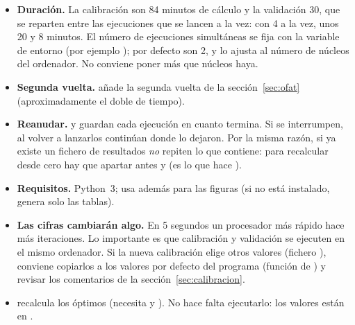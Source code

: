 \begin{itemize}
  \item \textbf{Duración.} La calibración son 84 minutos de cálculo y la validación 30, que se
        reparten entre las ejecuciones que se lancen a la vez: con 4 a la vez, unos 20 y 8
        minutos. El número de ejecuciones simultáneas se fija con la variable de entorno
         (por ejemplo ); por defecto son 2,
        y  lo ajusta al número de núcleos del ordenador. No conviene
        poner más que núcleos haya.
  \item \textbf{Segunda vuelta.}  añade la segunda vuelta de
        la sección~\ref{sec:ofat} (aproximadamente el doble de tiempo).
  \item \textbf{Reanudar.}  y  guardan cada ejecución en
        cuanto termina. Si se interrumpen, al volver a lanzarlos continúan donde lo dejaron.
        Por la misma razón, si ya existe un fichero de resultados \emph{no} repiten lo que
        contiene: para recalcular desde cero hay que apartar antes
         y  (es lo que hace
        ).
  \item \textbf{Requisitos.} Python~3;  usa además 
        para las figuras (si no está instalado, genera solo las tablas).
  \item \textbf{Las cifras cambiarán algo.} En 5 segundos un procesador más rápido hace más
        iteraciones. Lo importante es que calibración y validación se ejecuten en el mismo
        ordenador. Si la nueva calibración elige otros valores (fichero
        ), conviene copiarlos a los valores por defecto del programa
        (función  de ) y revisar los comentarios de
        la sección~\ref{sec:calibracion}.
  \item {} recalcula los óptimos (necesita  y ).
        No hace falta ejecutarlo: los valores están en .
\end{itemize}

